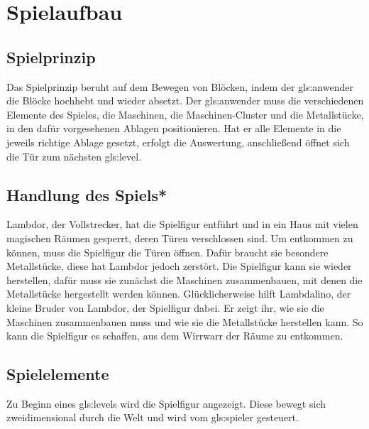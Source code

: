 \documentclass{scrartcl}
\begin{document}

\section{Spielaufbau}

\subsection{Spielprinzip}
Das Spielprinzip beruht auf dem Bewegen von Blöcken, indem der \gls{gls:anwender} die Blöcke hochhebt und wieder absetzt. Der \gls{gls:anwender} muss die verschiedenen Elemente des Spieles, die Maschinen, die Maschinen-Cluster und die Metallstücke, in den dafür vorgesehenen Ablagen positionieren. Hat er alle Elemente in die jeweils richtige Ablage gesetzt, erfolgt die Auswertung, anschließend öffnet sich die Tür zum nächsten \gls{gls:level}.

\subsection{Handlung des Spiels*} \label{subsection:Story}
Lambdor, der Vollstrecker, hat die Spielfigur entführt und in ein Haus mit vielen magischen Räumen gesperrt, deren Türen verschlossen sind. Um entkommen zu können, muss die Spielfigur die Türen öffnen. Dafür braucht sie besondere Metallstücke, diese hat Lambdor jedoch zerstört. Die Spielfigur kann sie wieder herstellen, dafür muss sie zunächst die Maschinen zusammenbauen, mit denen die Metallstücke hergestellt werden können. Glücklicherweise hilft Lambdalino, der kleine Bruder von Lambdor, der Spielfigur dabei. Er zeigt ihr, wie sie die Maschinen zusammenbauen muss und wie sie die Metallstücke herstellen kann. So kann die Spielfigur es schaffen, aus dem Wirrwarr der Räume zu entkommen.


\subsection{Spielelemente}

Zu Beginn eines \glspl{gls:level} wird die Spielfigur angezeigt. Diese bewegt sich zweidimensional durch die Welt und wird vom \gls{gls:spieler} gesteuert.
\end{document}

